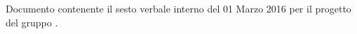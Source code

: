 Documento contenente il sesto verbale interno del 01 Marzo 2016 per il progetto \progetto{} del gruppo \gruppo{}.
